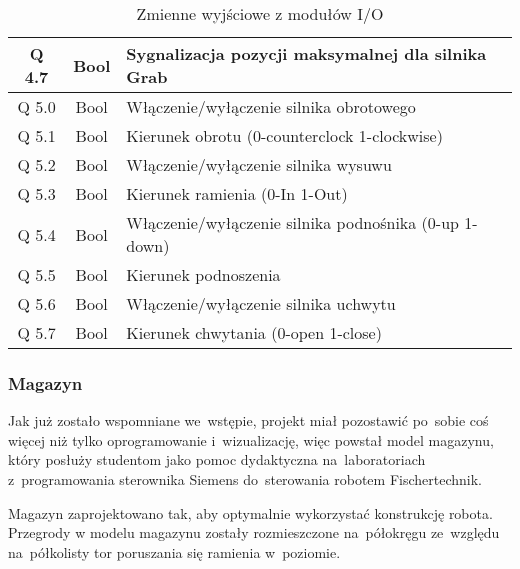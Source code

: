 \begin{table}[!htb]
\begin{center}
\begin{tabular}{|c|c| p{10cm} |}
Q       4.7 &  Bool   &   Sygnalizacja pozycji maksymalnej dla silnika Grab                \\\hline
Q       5.0 &  Bool   &   Włączenie/wyłączenie silnika obrotowego                                       \\\hline
Q       5.1  & Bool   &   Kierunek obrotu (0-counterclock 1-clockwise)                                    \\\hline
Q       5.2 &  Bool   &   Włączenie/wyłączenie silnika wysuwu                                                 \\\hline
Q       5.3  & Bool    &  Kierunek ramienia (0-In 1-Out)                                                 \\\hline
Q       5.4  & Bool  &    Włączenie/wyłączenie silnika podnośnika (0-up 1-down)                         \\\hline
Q       5.5  & Bool &     Kierunek podnoszenia                                                           \\\hline
Q       5.6 &  Bool   &   Włączenie/wyłączenie silnika uchwytu                                          \\\hline
Q       5.7  & Bool  &    Kierunek chwytania (0-open 1-close)                                           \\\hline
\end{tabular}
\end{center}
\vspace*{-6mm}
  \caption{Zmienne wyjściowe z modułów I/O}
	\label{out}
\end{table}

\subsubsection{Magazyn}
Jak już zostało wspomniane we~wstępie, projekt miał pozostawić po~sobie coś więcej niż tylko oprogramowanie i~wizualizację, więc powstał model magazynu, który posłuży studentom jako pomoc dydaktyczna na~laboratoriach z~programowania sterownika Siemens do~sterowania robotem Fischertechnik.

Magazyn zaprojektowano tak, aby optymalnie wykorzystać konstrukcję robota. Przegrody w modelu magazynu zostały rozmieszczone na~półokręgu ze~względu na~półkolisty tor poruszania się ramienia w~poziomie.

